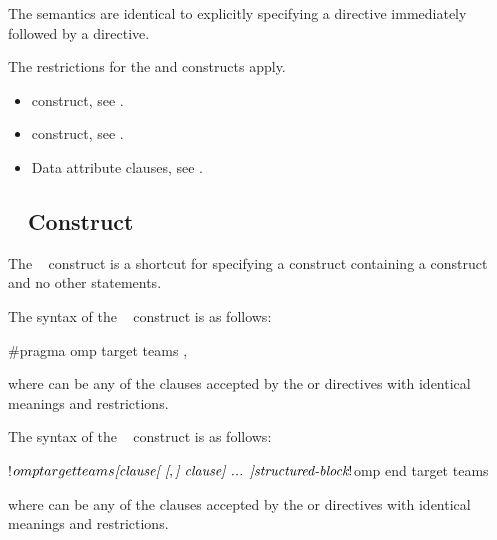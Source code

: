 \descr
The semantics are identical to explicitly specifying a  directive
immediately followed by a  directive.

\restrictions

The restrictions for the  and  constructs apply.

\crossreferences
\begin{itemize}
\item {} construct, see
.

\item {} construct, see
.

\item Data attribute clauses, see
.
\end{itemize}









\subsection{~ Construct}
\label{subsec:target teams Construct}
\summary
The ~ construct is a shortcut for specifying a  construct
containing a  construct and no other statements.

\syntax
\begin{ccppspecific}
The syntax of the ~ construct is as follows:

\begin{ompcPragma}
#pragma omp target teams \plc{[clause[ [},\plc{] clause] ... ] new-line}
\end{ompcPragma}

where  can be any of the clauses accepted by the  or  directives
with identical meanings and restrictions.
\end{ccppspecific}

\begin{fortranspecific}
The syntax of the ~ construct is as follows:

\begin{ompfPragma}
!$omp target teams \plc{[clause[ [},\plc{] clause] ... ]}
    \plc{structured-block}
!$omp end target teams
\end{ompfPragma}

where  can be any of the clauses accepted by the  or  directives
with identical meanings and restrictions.
\end{fortranspecific}

